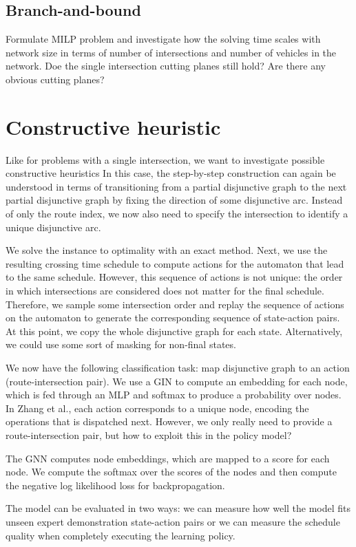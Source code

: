 \documentclass[a4paper]{article}
\theoremstyle{definition}
\theoremstyle{plain}
\begin{document}
\subsection{Branch-and-bound}
Formulate MILP problem and investigate how the solving time scales with network
size in terms of number of intersections and number of vehicles in the network.
Doe the single intersection cutting planes still hold? Are there any obvious
cutting planes?

\section{Constructive heuristic}

Like for problems with a single intersection, we want to investigate possible
constructive heuristics
%
In this case, the step-by-step construction can again be understood in terms of
transitioning from a partial disjunctive graph to the next partial disjunctive
graph by fixing the direction of some disjunctive arc.
%
Instead of only the route index, we now also need to specify the intersection to
identify a unique disjunctive arc.

We solve the instance to optimality with an exact method. Next, we use the
resulting crossing time schedule to compute actions for the automaton that lead
to the same schedule. However, this sequence of actions is not unique: the order
in which intersections are considered does not matter for the final schedule.
Therefore, we sample some intersection order and replay the sequence of actions
on the automaton to generate the corresponding sequence of state-action pairs.
At this point, we copy the whole disjunctive graph for each state.
Alternatively, we could use some sort of masking for non-final states.


We now have the following classification task: map disjunctive graph to an
action (route-intersection pair). We use a GIN to compute an embedding for each
node, which is fed through an MLP and softmax to produce a probability over
nodes. In Zhang et al., each action corresponds to a unique node, encoding the
operations that is dispatched next. However, we only really need to provide a
route-intersection pair, but how to exploit this in the policy model?

The GNN computes node embeddings, which are mapped to a score for each node. We
compute the softmax over the scores of the nodes and then compute the negative
log likelihood loss for backpropagation.


The model can be evaluated in two ways: we can measure how well the model fits
unseen expert demonstration state-action pairs or we can measure the schedule
quality when completely executing the learning policy.





\end{document}
